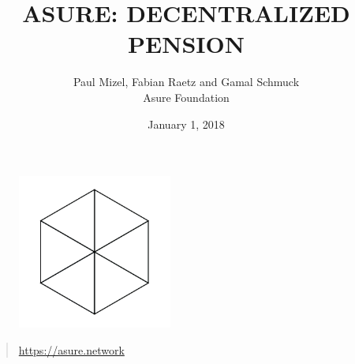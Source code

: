 \begin{figure}
    \centering
    \includegraphics[width=2.0in]{../img/logo.png}
\end{figure}

\title{ASURE: DECENTRALIZED PENSION}
\author{Paul Mizel, Fabian Raetz and Gamal Schmuck \\Asure Foundation}
\date{January 1, 2018}
\maketitle

\vskip 2.5in

\begin{quote}
	\centering
	\url{https://asure.network}
\end{quote}

\newpage 

